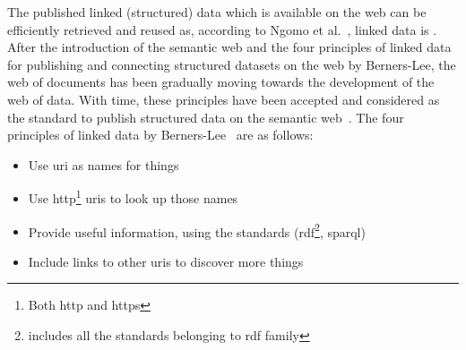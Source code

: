 \begin{doublespace}

%

The published linked (structured) data which is available on the web can be efficiently retrieved and reused as, according to Ngomo et al.~\cite{ngomo2014introduction}, linked data is .
After the introduction of the semantic web and the four principles of linked data for publishing and connecting structured datasets on the web by Berners-Lee, the web of documents has been gradually moving towards the development of the web of data. 
With time, these principles have been accepted and considered as the standard to publish structured data on the semantic web~\cite{bizer2009emerging, bizer2011linked, bizer2008linked, heath2011linked}. 
The four principles of linked data by Berners-Lee~\cite{berners1996linked}
\label{principles} 
are as follows:

\begin{itemize}
  \item Use \ac{uri} as names for things
  \item Use \ac{http}\footnote{Both \ac{http} and \ac{https}} \ac{uri}s to look up those names
  \item Provide useful information, using the standards (\ac{rdf}\footnote{includes all the standards belonging to \ac{rdf} family}, \ac{sparql})
  \item Include links to other \ac{uri}s to discover more things
\end{itemize}


\end{doublespace}
